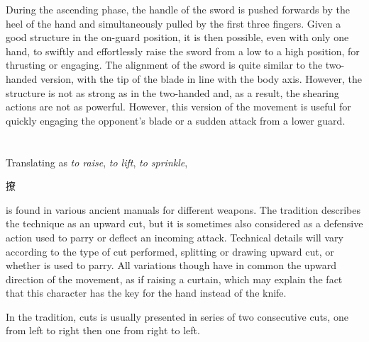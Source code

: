 During the ascending phase, the handle of the sword is pushed forwards by the heel of the hand and simultaneously pulled by the first three fingers. Given a good structure in the on-guard position, it is then possible, even with only one hand, to swiftly and effortlessly raise the sword from a low to a high position, for thrusting or engaging.  
The alignment of the sword is quite similar to the two-handed version, with the tip of the blade in line with the body axis. However, the structure is not as strong as in the two-handed \Duo{} and, as a result, the shearing actions are not as powerful. However, this version of the movement is useful for quickly engaging the opponent's blade or a sudden attack from a lower guard. 


\section{\Liao{}}
Translating as \textit{to raise}, \textit{to lift}, \textit{to sprinkle}, \Liao{} \begin{CJK*}{UTF8}{bsmi}撩\end{CJK*} is found in various ancient manuals for different weapons. The \Yangjia{} \Michuan{} tradition describes the technique as an upward cut, but it is sometimes also considered as a defensive action used to parry or deflect an incoming attack. Technical details will vary according to the type of cut performed, splitting or drawing upward cut, or whether \Liao{} is used to parry.
All variations though have in common the upward direction of the movement, as if raising a curtain, which may explain the fact that this character has the key for the hand instead of the knife.

In the \Yangjia{} \Michuan{} tradition, \Liao{} cuts is usually presented in series of two consecutive cuts, one from left to right then one from right to left.  

